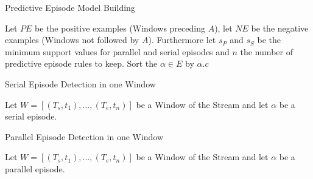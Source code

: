 \begin{algorithm}[H]
  \caption{Predictive Episode Model Building
    \label{alg_BuildPredictiveEpisodeModel}}
  \begin{algorithmic}[1]
    \Statex
    \Require Let $PE$ be the positive examples (Windows preceding $A$), let $NE$ be the negative examples (Windows not followed by $A$). Furthermore let $s_P$ and $s_S$ be the minimum support values for parallel and serial episodes and $n$ the number of predictive episode rules to keep.
      	 
      \EndFor
      \State Sort the $\alpha \in E$ by  $\alpha .c$
      \State {}
    \EndFunction
  \end{algorithmic}
\end{algorithm}

\begin{algorithm}[H]
  \caption{Serial Episode Detection in one Window
    \label{alg_SerialEpisodeDetection}}
  \begin{algorithmic}[1]
    \Statex
    \Require Let $W=[(T_s,t_1),...,(T_e,t_n)]$ be a Window of the Stream and let $\alpha$ be a serial episode.
        \EndIf
      \EndWhile
      \State {}
    \EndFunction
  \end{algorithmic}
\end{algorithm}

\begin{algorithm}[H]
  \caption{Parallel Episode Detection in one Window
    \label{alg_ParallelEpisodeDetection}}
  \begin{algorithmic}[1]
    \Statex
    \Require Let $W=[(T_s,t_1),...,(T_e,t_n)]$ be a Window of the Stream and let $\alpha$ be a parallel episode.
      	\EndFor      
        \EndIf
      \EndWhile
      \State {}
    \EndFunction
  \end{algorithmic}
\end{algorithm}

